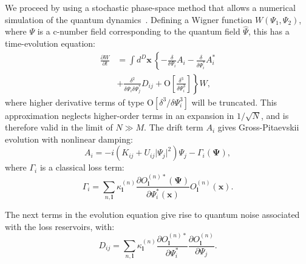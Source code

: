 \documentclass[aps,prl,twocolumn,showpacs,amsmath,amssymb,superscriptaddress]{revtex4-1}
\newcommand{\petersremark}[1]{\textcolor{cyan}{{[}PD: #1{]}}}
\newcommand{\xvec}{\boldsymbol{x}}
\newcommand{\lvec}{\boldsymbol{l}}
\newcommand{\Psivec}{\boldsymbol{\Psi}}
\begin{document}
We proceed by using a stochastic phase-space method
that allows a numerical simulation of the quantum dynamics~\cite{Drummond1993,Steel1998,Hoffmann2008}.
Defining a Wigner function $W\left(\Psi_{1},\Psi_{2}\right)$,
where $\Psi$ is a c-number field corresponding to the quantum field $\hat{\Psi}$,
this has a time-evolution equation:
\begin{equation}
\begin{split}
	\frac{\partial W}{\partial t} & = \int d^D \xvec \,\left\{
		-\frac{\delta}{\delta\Psi_{i}} A_{i} -
		\frac{\delta}{\delta\Psi_{i}^*} A_{i}^* \right. \\
& + \left. \frac{\delta^{2}}{\delta\Psi_{i} \delta\Psi_{j}^{*}}D_{ij} +
		\mbox{O} \left[ \frac{\delta^{3}}{\delta\Psi_{i}^{3}} \right]
	\right\} W,
\end{split}
\end{equation}
where higher derivative terms of type $\mbox{O}\left[\delta^3/\delta\Psi_{i}^{3}\right]$
will be truncated.
This approximation neglects higher-order terms in an expansion in $1/\sqrt{N}$,
and is therefore valid in the limit of $N \gg M$.
The drift term $A_{i}$ gives Gross-Pitaevskii evolution with nonlinear damping:
\begin{equation}
	A_{i} = -i \left( K_{ij} + U_{ij} \lvert \Psi_{j} \rvert^{2} \right) \Psi_{j} -
	\Gamma_{i} \left( \Psivec \right),
\end{equation}
where $\Gamma_{i}$ is a classical loss term:
\begin{equation}
	\Gamma_{i} = \sum_{n,\lvec} \kappa_{\lvec}^{(n)}
	\frac{
		\partial O_{\lvec}^{(n)*} \left( \Psivec \right)
	}{
		\partial \Psi_{i}^* \left( \xvec \right)
	}
	O_{\lvec}^{(n)} \left( \xvec \right).
\end{equation}

The next terms in the evolution equation give rise to
quantum noise associated with the loss reservoirs,
with:
\begin{equation}
	D_{ij} = \sum_{n,\lvec} \kappa_{\lvec}^{(n)}
	\frac{\partial O_{\lvec}^{(n)*}}{\partial\Psi_{i}^{*}}
	\frac{\partial O_{\lvec}^{(n)}}{\partial\Psi_{j}}.
\end{equation}
\end{document}

